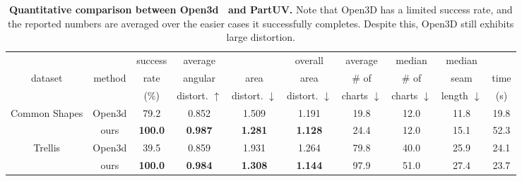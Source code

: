 \begin{table}[t]
  \centering
  \scriptsize
  \setlength{\tabcolsep}{1.5pt}
  \caption{\textbf{Quantitative comparison between Open3d~\cite{Zhou2018} and PartUV.} Note that Open3D has a limited success rate, and the reported numbers are averaged over the easier cases it successfully completes. Despite this, Open3D still exhibits large distortion.}
  \vspace{-2em}
    \begin{tabular}{c|c|cccccccc}
    \toprule
          &       & \multicolumn{1}{c}{success}
                  & \multicolumn{1}{c}{average}
                  & \multicolumn{1}{c}{}
                  & \multicolumn{1}{c}{overall}
                  & \multicolumn{1}{c}{average}
                  & \multicolumn{1}{c}{median}
                  & \multicolumn{1}{c}{median}
                  &  \\
              \multicolumn{1}{c|}{dataset}     
              & \multicolumn{1}{c|}{method}
              & \multicolumn{1}{c}{rate}
                  & \multicolumn{1}{c}{angular}
                  & \multicolumn{1}{c}{area}
                  & \multicolumn{1}{c}{area}
                  & \multicolumn{1}{c}{\# of}
                  & \multicolumn{1}{c}{\# of}
                  & \multicolumn{1}{c}{seam}
                  & \multicolumn{1}{c}{time} \\
        &
        & \multicolumn{1}{c}{(\%)}
        & \multicolumn{1}{c}{ distort. $\uparrow$}
        & \multicolumn{1}{c}{distort. $\downarrow$}
        & \multicolumn{1}{c}{distort. $\downarrow$}
        & \multicolumn{1}{c}{charts $\downarrow$}
        & \multicolumn{1}{c}{charts $\downarrow$}
        & \multicolumn{1}{c}{ length $\downarrow$}
        & \multicolumn{1}{c}{ (s) } \\
    \midrule
 \multicolumn{1}{c|}{\multirow{2}[0]{*}{\parbox{1.5cm}{\centering Common Shapes}}} & Open3d & 79.2  & 0.852 & 1.509 & 1.191 & 19.8  & 12.0  & 11.8  & 19.8 \\
          & ours  & \textbf{100.0} & \textbf{0.987} & \textbf{1.281} & \textbf{1.128} & 24.4  & 12.0  & 15.1  & 52.3 \\
    \midrule
 \multicolumn{1}{c|}{\multirow{2}[0]{*}{\parbox{1.5cm}{\centering Trellis }}} & Open3d & 39.5  & 0.859 & 1.931 & 1.264 & 79.8  & 40.0  & 25.9  & 24.1 \\
          & ours  & \textbf{100.0} & \textbf{0.984} & \textbf{1.308} & \textbf{1.144} & 97.9  & 51.0  & 27.4  & 23.7 \\
    \midrule

\end{tabular}
\end{table}
